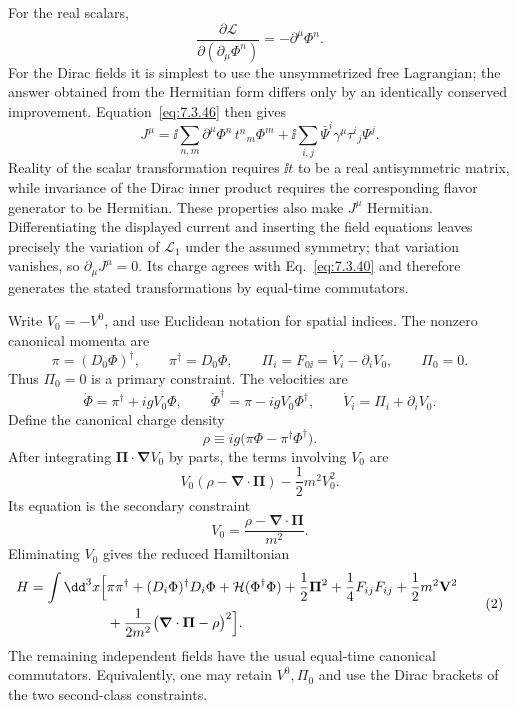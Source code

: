 \begin{enumerate}
For the real scalars,
\[
 \frac{\partial\mathcal L}{\partial(\partial_\mu\Phi^n)}
 =-\partial^\mu\Phi^n .
\]
For the Dirac fields it is simplest to use the unsymmetrized free
Lagrangian; the answer obtained from the Hermitian form differs only by
an identically conserved improvement.  Equation~\eqref{eq:7.3.46} then
gives
\[
 \boxed{\;
 J^\mu=
 \ii\sum_{n,m}\partial^\mu\Phi^n\,t^n{}_m\Phi^m
 +\ii\sum_{i,j}\bar\Psi^i\gamma^\mu\tau^i{}_j\Psi^j .\;}
\]
Reality of the scalar transformation requires \(\ii t\) to be a real
antisymmetric matrix, while invariance of the Dirac inner product
requires the corresponding flavor generator to be Hermitian.  These
properties also make \(J^\mu\) Hermitian.  Differentiating the displayed
current and inserting the field equations leaves precisely the
variation of \(\mathcal L_1\) under the assumed symmetry; that variation
vanishes, so \(\partial_\mu J^\mu=0\).  Its charge agrees with
Eq.~\eqref{eq:7.3.40} and therefore generates the stated transformations
by equal-time commutators.

Write \(V_0=-V^0\), and use Euclidean notation for spatial indices.  The
nonzero canonical momenta are
\[
 \pi=(D_0\Phi)^\dagger,\qquad
 \pi^\dagger=D_0\Phi,\qquad
 \Pi_i=F_{0\ii}=\dot V_i-\partial_iV_0 ,
 \qquad \Pi_0=0 .
\]
Thus \(\Pi_0=0\) is a primary constraint.  The velocities are
\[
 \dot\Phi=\pi^\dagger+igV_0\Phi,\qquad
 \dot\Phi^\dagger=\pi-igV_0\Phi^\dagger,\qquad
 \dot V_i=\Pi_i+\partial_iV_0 .
\]
Define the canonical charge density
\[
 \rho\equiv ig\bigl(\pi\Phi-\pi^\dagger\Phi^\dagger\bigr).
\]
After integrating \(\boldsymbol\Pi\cdot\boldsymbol\nabla V_0\) by parts,
the terms involving \(V_0\) are
\[
 V_0(\rho-\boldsymbol\nabla\mathbin{\cdot}\boldsymbol\Pi)
 -\frac12m^2V_0^2 .
\]
Its equation is the secondary constraint
\[
 V_0=\frac{\rho-\boldsymbol\nabla\cdot\boldsymbol\Pi}{m^2}.
\]
Eliminating \(V_0\) gives the reduced Hamiltonian
\[
 \begin{split}
 H=\int \dd^3x\Bigl[&
 \pi\pi^\dagger+(D_i\Phi)^\dagger D_i\Phi
 +\mathcal H(\Phi^\dagger\Phi)
 +\frac12\boldsymbol\Pi^2+\frac14F_{ij}F_{ij}
 +\frac12m^2\mathbf V^2\\
 &+\frac1{2m^2}
 \bigl(\boldsymbol\nabla\cdot\boldsymbol\Pi-\rho\bigr)^2\Bigr].
 \end{split}\tag{2}
\]
The remaining independent fields have the usual equal-time canonical
commutators.  Equivalently, one may retain \(V^0,\Pi_0\) and use the
Dirac brackets of the two second-class constraints.


\end{enumerate}
